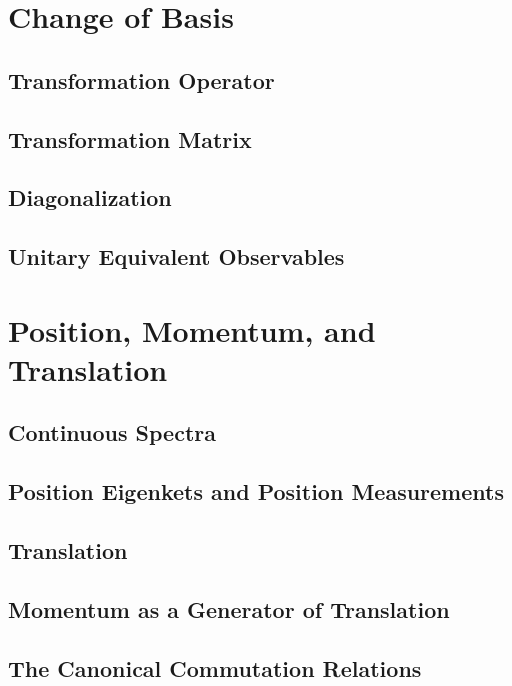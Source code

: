 \documentclass[11pt]{elegantbook}
\begin{document}
\newpage

\section{Change of Basis}

\subsection{Transformation Operator}

\subsection{Transformation Matrix}

\subsection{Diagonalization}

\subsection{Unitary Equivalent Observables}

\newpage

\section{Position, Momentum, and Translation}

\subsection{Continuous Spectra}

\subsection{Position Eigenkets and Position Measurements}

\subsection{Translation}

\subsection{Momentum as a Generator of Translation}

\subsection{The Canonical Commutation Relations}
\end{document}
